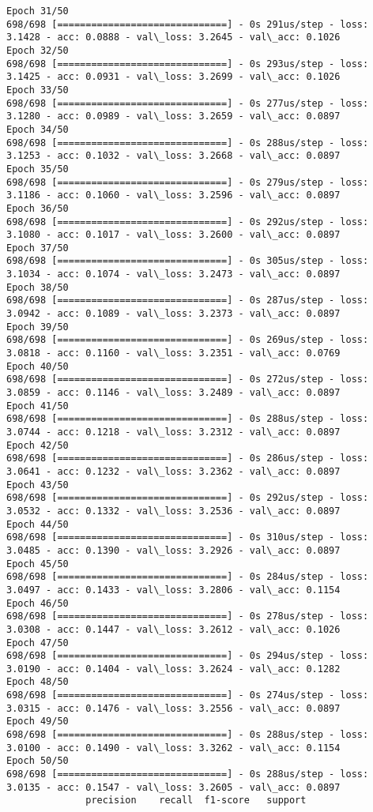 \documentclass[11pt]{article}
\begin{document}
\begin{Verbatim}[commandchars=\\\{\}]
Epoch 31/50
698/698 [==============================] - 0s 291us/step - loss: 3.1428 - acc: 0.0888 - val\_loss: 3.2645 - val\_acc: 0.1026
Epoch 32/50
698/698 [==============================] - 0s 293us/step - loss: 3.1425 - acc: 0.0931 - val\_loss: 3.2699 - val\_acc: 0.1026
Epoch 33/50
698/698 [==============================] - 0s 277us/step - loss: 3.1280 - acc: 0.0989 - val\_loss: 3.2659 - val\_acc: 0.0897
Epoch 34/50
698/698 [==============================] - 0s 288us/step - loss: 3.1253 - acc: 0.1032 - val\_loss: 3.2668 - val\_acc: 0.0897
Epoch 35/50
698/698 [==============================] - 0s 279us/step - loss: 3.1186 - acc: 0.1060 - val\_loss: 3.2596 - val\_acc: 0.0897
Epoch 36/50
698/698 [==============================] - 0s 292us/step - loss: 3.1080 - acc: 0.1017 - val\_loss: 3.2600 - val\_acc: 0.0897
Epoch 37/50
698/698 [==============================] - 0s 305us/step - loss: 3.1034 - acc: 0.1074 - val\_loss: 3.2473 - val\_acc: 0.0897
Epoch 38/50
698/698 [==============================] - 0s 287us/step - loss: 3.0942 - acc: 0.1089 - val\_loss: 3.2373 - val\_acc: 0.0897
Epoch 39/50
698/698 [==============================] - 0s 269us/step - loss: 3.0818 - acc: 0.1160 - val\_loss: 3.2351 - val\_acc: 0.0769
Epoch 40/50
698/698 [==============================] - 0s 272us/step - loss: 3.0859 - acc: 0.1146 - val\_loss: 3.2489 - val\_acc: 0.0897
Epoch 41/50
698/698 [==============================] - 0s 288us/step - loss: 3.0744 - acc: 0.1218 - val\_loss: 3.2312 - val\_acc: 0.0897
Epoch 42/50
698/698 [==============================] - 0s 286us/step - loss: 3.0641 - acc: 0.1232 - val\_loss: 3.2362 - val\_acc: 0.0897
Epoch 43/50
698/698 [==============================] - 0s 292us/step - loss: 3.0532 - acc: 0.1332 - val\_loss: 3.2536 - val\_acc: 0.0897
Epoch 44/50
698/698 [==============================] - 0s 310us/step - loss: 3.0485 - acc: 0.1390 - val\_loss: 3.2926 - val\_acc: 0.0897
Epoch 45/50
698/698 [==============================] - 0s 284us/step - loss: 3.0497 - acc: 0.1433 - val\_loss: 3.2806 - val\_acc: 0.1154
Epoch 46/50
698/698 [==============================] - 0s 278us/step - loss: 3.0308 - acc: 0.1447 - val\_loss: 3.2612 - val\_acc: 0.1026
Epoch 47/50
698/698 [==============================] - 0s 294us/step - loss: 3.0190 - acc: 0.1404 - val\_loss: 3.2624 - val\_acc: 0.1282
Epoch 48/50
698/698 [==============================] - 0s 274us/step - loss: 3.0315 - acc: 0.1476 - val\_loss: 3.2556 - val\_acc: 0.0897
Epoch 49/50
698/698 [==============================] - 0s 288us/step - loss: 3.0100 - acc: 0.1490 - val\_loss: 3.3262 - val\_acc: 0.1154
Epoch 50/50
698/698 [==============================] - 0s 288us/step - loss: 3.0135 - acc: 0.1547 - val\_loss: 3.2605 - val\_acc: 0.0897
              precision    recall  f1-score   support


\end{Verbatim}
\end{document}

